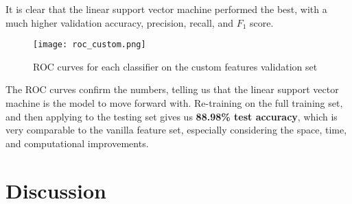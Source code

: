 \documentclass{article} %
\begin{document}
It is clear that the linear support vector machine performed the best, with a much higher validation accuracy, precision, recall, and $F_1$ score.
\begin{figure}[h]
\centering
\texttt{[image: roc\_custom.png]}
\caption{ROC curves for each classifier on the custom features validation set}
\end{figure}
The ROC curves confirm the numbers, telling us that the linear support vector machine is the model to move forward with.  Re-training on the full training set, and then applying to the testing set gives us \textbf{88.98\% test accuracy}, which is very comparable to the vanilla feature set, especially considering the space, time, and computational improvements.
\section{Discussion}
\end{document}
